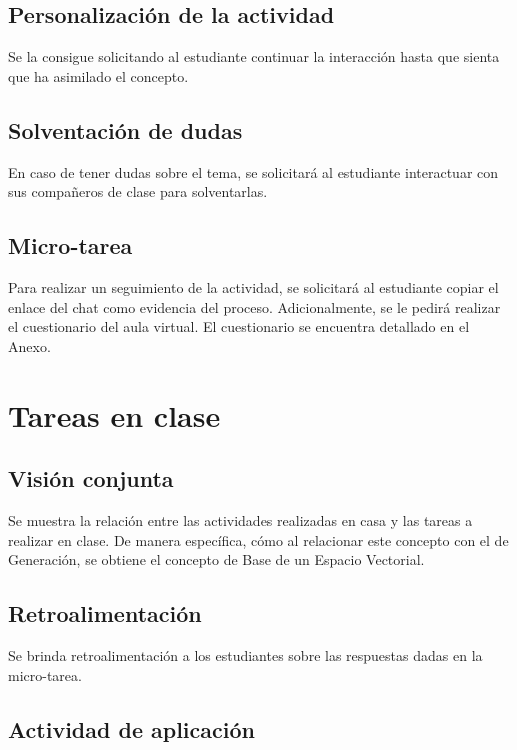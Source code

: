 \documentclass[a4,11pt]{aleph-notas}
\begin{document}
\subsection{Personalización de la actividad}

Se la consigue solicitando al estudiante continuar la interacción hasta que sienta que ha asimilado el concepto.

\subsection{Solventación de dudas}

En caso de tener dudas sobre el tema, se solicitará al estudiante interactuar con sus compañeros de clase para solventarlas.

\subsection{Micro-tarea}

Para realizar un seguimiento de la actividad, se solicitará al estudiante copiar el enlace del chat como evidencia del proceso. Adicionalmente, se le pedirá realizar el cuestionario del aula virtual. El cuestionario se encuentra detallado en el Anexo.

\section{Tareas en clase}

\subsection{Visión conjunta}

Se muestra la relación entre las actividades realizadas en casa y las tareas a realizar en clase. De manera específica, cómo al relacionar este concepto con el de Generación, se obtiene el concepto de Base de un Espacio Vectorial.

\subsection{Retroalimentación}

Se brinda retroalimentación a los estudiantes sobre las respuestas dadas en la micro-tarea.

\subsection{Actividad de aplicación}
\end{document}
